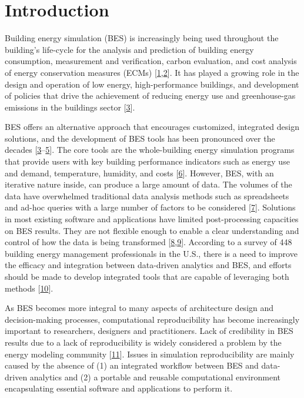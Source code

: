 \documentclass[3p, times]{elsarticle} %
\begin{document}
\hypertarget{introduction}{%
\section{Introduction}\label{introduction}}

Building energy simulation (BES) is increasingly being used throughout the
building's life-cycle for the analysis and prediction of building energy
consumption, measurement and verification, carbon evaluation, and cost analysis
of energy conservation measures (ECMs) {[}\protect\hyperlink{ref-Chong2017}{1},\protect\hyperlink{ref-Kneifel2010}{2}{]}. It has played
a growing role in the design and operation of low energy, high-performance
buildings, and development of policies that drive the achievement of reducing
energy use and greenhouse-gas emissions in the buildings sector {[}\protect\hyperlink{ref-Hong2018}{3}{]}.

BES offers an alternative approach that encourages customized, integrated design
solutions, and the development of BES tools has been pronounced over the decades
{[}\protect\hyperlink{ref-Hong2018}{3}--\protect\hyperlink{ref-Chen2017Automatic}{5}{]}. The core tools are the
whole-building energy simulation programs that provide users with key building
performance indicators such as energy use and demand, temperature, humidity, and
costs {[}\protect\hyperlink{ref-Crawley2008a}{6}{]}. However, BES, with an iterative nature inside, can
produce a large amount of data. The volumes of the data have overwhelmed
traditional data analysis methods such as spreadsheets and ad-hoc queries with a
large number of factors to be considered {[}\protect\hyperlink{ref-Kim2011}{7}{]}. Solutions in most existing
software and applications have limited post-processing capacities on BES
results. They are not flexible enough to enable a clear understanding and
control of how the data is being transformed {[}\protect\hyperlink{ref-Miller2013}{8},\protect\hyperlink{ref-Attia2013a}{9}{]}.
According to a survey of 448 building energy management professionals in the
U.S., there is a need to improve the efficacy and integration between
data-driven analytics and BES, and efforts should be made to develop integrated
tools that are capable of leveraging both methods {[}\protect\hyperlink{ref-Srivastava2019}{10}{]}.

As BES becomes more integral to many aspects of architecture design and
decision-making processes, computational reproducibility has become increasingly
important to researchers, designers and practitioners. Lack of credibility in
BES results due to a lack of reproducibility is widely considered a problem by
the energy modeling community {[}\protect\hyperlink{ref-Fleming2012}{11}{]}. Issues in simulation
reproducibility are mainly caused by the absence of (1) an integrated workflow
between BES and data-driven analytics and (2) a portable and reusable
computational environment encapsulating essential software and applications to
perform it.
\end{document}
